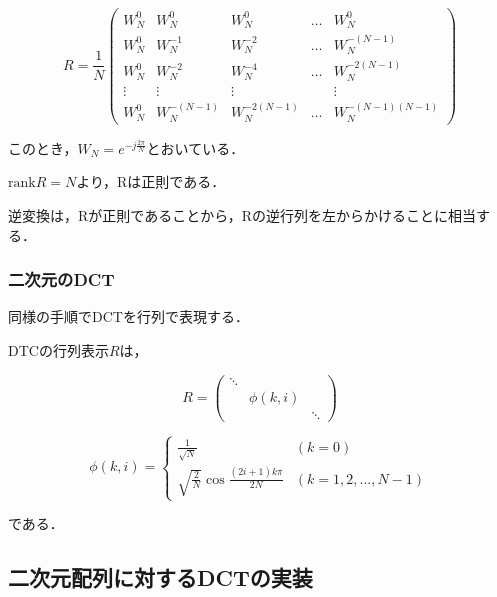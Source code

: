 \documentclass[uplatex,dvipdfmx,ja=standard]{bxjsarticle}
\begin{document}
\begin{equation}
    R = \frac{1}{N}
    \label{exp:mat_dft}
        \begin{pmatrix}   
            W_N^0  & W_N^0        & W_N^0         & \ldots  &  W_N^0     \\
            W_N^0  & W_N^{-1}     & W_N^{-2}      & \ldots  & W_N^{-(N-1)}  \\
            W_N^0  & W_N^{-2}     & W_N^{-4}      & \ldots  & W_N^{-2(N-1)}  \\
            \vdots & \vdots       & \vdots        &         & \vdots \\
            W_N^0  & W_N^{-(N-1)} & W_N^{-2(N-1)} & \ldots  & W_N^{-(N-1)(N-1)}
    \end{pmatrix}
\end{equation}

このとき，$W_N = e^{-j\frac{2\pi}{N}}$とおいている．

$\mathrm{rank}R = N$より，Rは正則である．

逆変換は，Rが正則であることから，Rの逆行列を左からかけることに相当する．

\subsubsection{二次元のDCT}

同様の手順でDCTを行列で表現する．

DTCの行列表示$R$は，

\begin{equation}
    R =
    \label{exp:base}
        \begin{pmatrix}   
\ddots &           &        \\
       & \phi(k,i) &        \\
       &           & \ddots         
        \end{pmatrix}
\end{equation}

\begin{displaymath}
\phi(k,i)=
\left\{
\begin{array}{ll}
    \frac{1}{\sqrt{N}} & (k=0) \\
    \sqrt{\frac{2}{N}} \cos \frac{(2i+1)k\pi}{2N} & (k = 1,2,...,N-1)
\end{array}
\right.
\end{displaymath}

である．

\subsection{二次元配列に対するDCTの実装}
\end{document}
